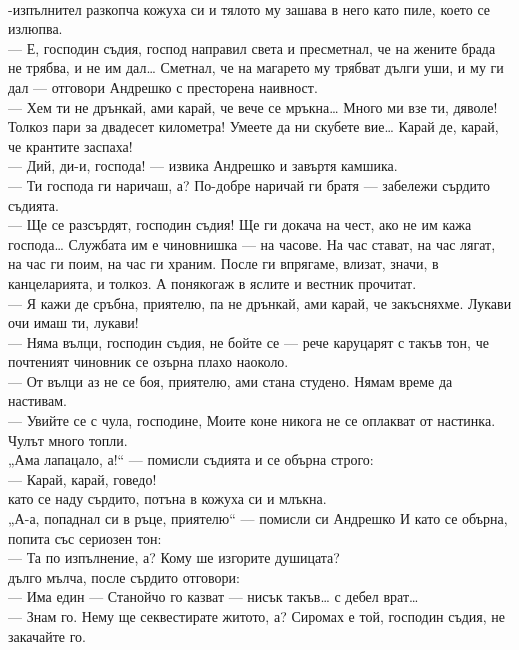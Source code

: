 \documentclass[12pt,a4paper]{article}
\begin{document}
\\
-изпълнител разкопча кожуха си и тялото му зашава в него като пиле, което се излюпва.
\\
— Е, господин съдия, господ направил света и пресметнал, че на жените брада не трябва, и не им дал… Сметнал, че на магарето му трябват дълги уши, и му ги дал — отговори Андрешко с престорена наивност.
\\
— Хем ти не дрънкай, ами карай, че вече се мръкна… Много ми взе ти, дяволе! Толкоз пари за двадесет километра! Умеете да ни скубете вие… Карай де, карай, че крантите заспаха!
\\
— Дий, ди-и, господа! — извика Андрешко и завъртя камшика.
\\
— Ти господа ги наричаш, а? По-добре наричай ги братя — забележи сърдито съдията.
\\
— Ще се разсърдят, господин съдия! Ще ги докача на чест, ако не им кажа господа… Службата им е чиновнишка — на часове. На час стават, на час лягат, на час ги поим, на час ги храним. После ги впрягаме, влизат, значи, в канцеларията, и толкоз. А понякогаж в яслите и вестник прочитат.
\\
— Я кажи де сръбна, приятелю, па не дрънкай, ами карай, че закъсняхме. Лукави очи имаш ти, лукави!
\\
— Няма вълци, господин съдия, не бойте се — рече каруцарят с такъв тон, че почтеният чиновник се озърна плахо наоколо.
\\
— От вълци аз не се боя, приятелю, ами стана студено. Нямам време да настивам.
\\
— Увийте се с чула, господине, Моите коне никога не се оплакват от настинка. Чулът много топли.
\\
\indent„Ама лапацало, а!“ — помисли съдията и се обърна строго:
\\
— Карай, карай, говедо!
\\
 като се наду сърдито, потъна в кожуха си и млъкна.
\\
\indent„А-а, попаднал си в ръце, приятелю“ — помисли си Андрешко И като се обърна, попита със сериозен тон:
\\
— Та по изпълнение, а? Кому ше изгорите душицата?
\\
 дълго мълча, после сърдито отговори:
\\
— Има един — Станойчо го казват — нисък такъв… с дебел врат…
\\
— Знам го. Нему ще секвестирате житото, а? Сиромах е той, господин съдия, не закачайте го.
\\
\end{document}
